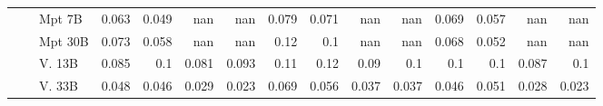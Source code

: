 \begin{table}[!htbp]
{\begin{tabular}{l|l|l|rrrr|rrrr|rrrr}
 &  & Mpt 7B & {\cellcolor[HTML]{D4EECE}} \color[HTML]{000000} 0.063 & {\cellcolor[HTML]{E5F5E0}} \color[HTML]{000000} 0.049 & {\cellcolor[HTML]{000000}} \color[HTML]{F1F1F1} nan & {\cellcolor[HTML]{000000}} \color[HTML]{F1F1F1} nan & {\cellcolor[HTML]{FEE2C6}} \color[HTML]{000000} 0.079 & {\cellcolor[HTML]{FEE6CF}} \color[HTML]{000000} 0.071 & {\cellcolor[HTML]{000000}} \color[HTML]{F1F1F1} nan & {\cellcolor[HTML]{000000}} \color[HTML]{F1F1F1} nan & {\cellcolor[HTML]{D6D6E9}} \color[HTML]{000000} 0.069 & {\cellcolor[HTML]{E2E2EF}} \color[HTML]{000000} 0.057 & {\cellcolor[HTML]{000000}} \color[HTML]{F1F1F1} nan & {\cellcolor[HTML]{000000}} \color[HTML]{F1F1F1} nan \\
 &  & Mpt 30B & {\cellcolor[HTML]{C8E9C1}} \color[HTML]{000000} 0.073 & {\cellcolor[HTML]{DAF0D4}} \color[HTML]{000000} 0.058 & {\cellcolor[HTML]{000000}} \color[HTML]{F1F1F1} nan & {\cellcolor[HTML]{000000}} \color[HTML]{F1F1F1} nan & {\cellcolor[HTML]{FDC28B}} \color[HTML]{000000} 0.12 & {\cellcolor[HTML]{FDD5AB}} \color[HTML]{000000} 0.1 & {\cellcolor[HTML]{000000}} \color[HTML]{F1F1F1} nan & {\cellcolor[HTML]{000000}} \color[HTML]{F1F1F1} nan & {\cellcolor[HTML]{D7D7E9}} \color[HTML]{000000} 0.068 & {\cellcolor[HTML]{E8E6F2}} \color[HTML]{000000} 0.052 & {\cellcolor[HTML]{000000}} \color[HTML]{F1F1F1} nan & {\cellcolor[HTML]{000000}} \color[HTML]{F1F1F1} nan \\
 &  & V. 13B  & {\cellcolor[HTML]{B5E1AE}} \color[HTML]{000000} 0.085 & {\cellcolor[HTML]{9ED798}} \color[HTML]{000000} 0.1 & {\cellcolor[HTML]{BBE4B4}} \color[HTML]{000000} 0.081 & {\cellcolor[HTML]{A9DCA3}} \color[HTML]{000000} 0.093 & {\cellcolor[HTML]{FDCB9B}} \color[HTML]{000000} 0.11 & {\cellcolor[HTML]{FDC692}} \color[HTML]{000000} 0.12 & {\cellcolor[HTML]{FEDCB9}} \color[HTML]{000000} 0.09 & {\cellcolor[HTML]{FDD5AB}} \color[HTML]{000000} 0.1 & {\cellcolor[HTML]{A9A7CF}} \color[HTML]{F1F1F1} 0.1 & {\cellcolor[HTML]{A3A0CB}} \color[HTML]{F1F1F1} 0.1 & {\cellcolor[HTML]{BCBDDC}} \color[HTML]{000000} 0.087 & {\cellcolor[HTML]{A29FCB}} \color[HTML]{F1F1F1} 0.1 \\
 &  & V. 33B  & {\cellcolor[HTML]{E5F5E1}} \color[HTML]{000000} 0.048 & {\cellcolor[HTML]{E7F6E3}} \color[HTML]{000000} 0.046 & {\cellcolor[HTML]{F3FAF0}} \color[HTML]{000000} 0.029 & {\cellcolor[HTML]{F7FCF5}} \color[HTML]{000000} 0.023 & {\cellcolor[HTML]{FEE7D1}} \color[HTML]{000000} 0.069 & {\cellcolor[HTML]{FEEDDC}} \color[HTML]{000000} 0.056 & {\cellcolor[HTML]{FFF5EB}} \color[HTML]{000000} 0.037 & {\cellcolor[HTML]{FFF5EB}} \color[HTML]{000000} 0.037 & {\cellcolor[HTML]{EEECF4}} \color[HTML]{000000} 0.046 & {\cellcolor[HTML]{E9E8F2}} \color[HTML]{000000} 0.051 & {\cellcolor[HTML]{F9F8FB}} \color[HTML]{000000} 0.028 & {\cellcolor[HTML]{FCFBFD}} \color[HTML]{000000} 0.023 \\

\end{tabular}}
\end{table}
